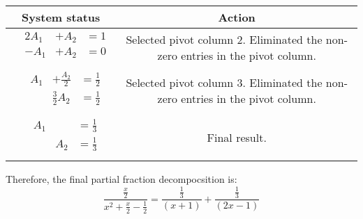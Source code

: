 {\begin{longtable}{cc} System status&Action \\\hline $\begin{array}{llll} & 2A_{1} & +A_{2} & =1\\ & -A_{1} & +A_{2} & =0\\\end{array}$ & Selected pivot column 2. Eliminated the non-zero entries in the pivot column. \\\hline $\begin{array}{llll} & A_{1} & +\frac{A_{2} }{2} & =\frac{1}{2}\\ & & \frac{3}{2}A_{2} & =\frac{1}{2}\\\end{array}$& Selected pivot column 3. Eliminated the non-zero entries in the pivot column. \\\hline $\begin{array}{llll} & A_{1} & & =\frac{1}{3}\\ & & A_{2} & =\frac{1}{3}\\\end{array}$& Final result.\\ \end{longtable}
Therefore, the final partial fraction decompocsition is: \[\frac{\frac{x }{2}}{x^{2}+\frac{x }{2} -\frac{1}{2} } =\frac{ \frac{ 1}{3}}{(x +1)}+ \frac{\frac{1}{3}}{(2x -1)}\]
}

